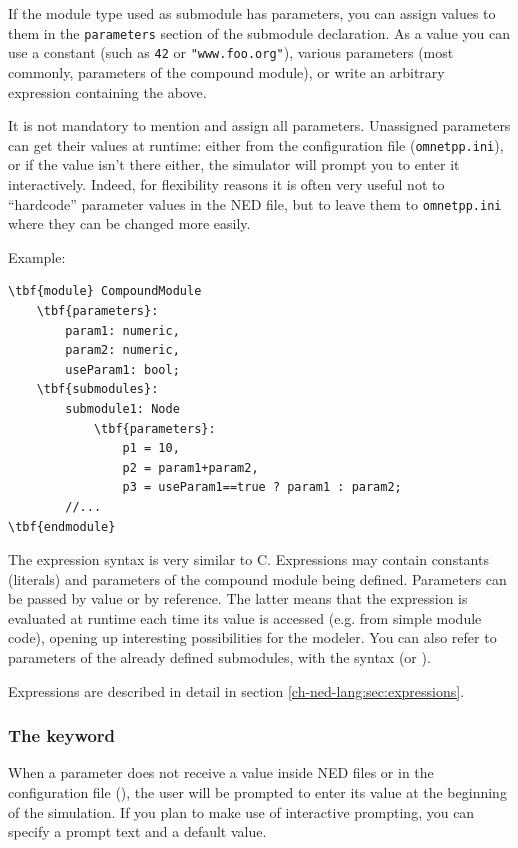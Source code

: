 
If the module type used as submodule has parameters, you can assign
values to them in the \texttt{parameters} section of the submodule
declaration.
As a value you can use a constant (such as \texttt{42} or
\texttt{"www.foo.org"}), various parameters (most commonly, parameters
of the compound module), or write an arbitrary expression containing
the above.

It is not mandatory to mention and assign all parameters.
Unassigned parameters can get their values at runtime: either from
the configuration file (\texttt{omnetpp.ini}), or if the value
isn't there either, the simulator will prompt you to enter it
interactively. Indeed, for flexibility reasons it is often very useful
not to ``hardcode'' parameter values in the NED file,
but to leave them to \texttt{omnetpp.ini} where they can be
changed more easily.


Example:

\begin{Verbatim}[commandchars=\\\{\}]
\tbf{module} CompoundModule
    \tbf{parameters}:
        param1: numeric,
        param2: numeric,
        useParam1: bool;
    \tbf{submodules}:
        submodule1: Node
            \tbf{parameters}:
                p1 = 10,
                p2 = param1+param2,
                p3 = useParam1==true ? param1 : param2;
        //...
\tbf{endmodule}
\end{Verbatim}


The expression syntax  is very similar to C.
Expressions may contain constants (literals) and parameters of the
compound module being defined. Parameters can be passed by value
or by reference. The latter means that the expression is evaluated
at runtime each time its value is accessed (e.g. from simple module
code), opening up interesting possibilities for the modeler.
You can also refer to parameters of the already defined submodules,
with the syntax 
(or ).

Expressions are described in detail in section \ref{ch-ned-lang:sec:expressions}.


\subsubsection{The  keyword}
\label{sec:ch-ned-lang:input}

When a parameter does not receive a value inside NED files or in
the configuration file (), the user will be prompted
to enter its value at the beginning of the simulation.
If you plan to make use of interactive prompting, you can specify
a prompt text and a default value.

